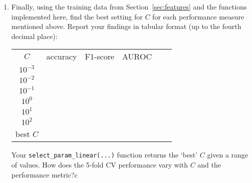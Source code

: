 \documentclass[11pt]{article}
\begin{document}
\begin{enumerate}
\item {} Finally, using the training data from Section~\ref{sec:features} and the functions implemented here, find the best setting for $C$ for each performance measure mentioned above. Report your findings in tabular format (up to the fourth decimal place):

\solution{
}

\begin{table}[H]
\centering
\small
\begin{tabular}{c|ccc}%
$C$       & accuracy  & F1-score  & AUROC  \\%
$10^{-3}$ & & & & & & \\
$10^{-2}$ & & & & & & \\
$10^{-1}$ & & & & & & \\
$10^{0}$  & & & & & & \\
$10^{1}$  & & & & & & \\
$10^{2}$  & & & & & & \\ \hline
best $C$  & & & & & & \\
\end{tabular}
\end{table}

Your \verb|select_param_linear(...)| function returns the `best' $C$ given a range of values. How does the 5-fold CV performance vary with $C$ and the performance metric?c\\
\solution{
}

\end{enumerate}
\end{document}
